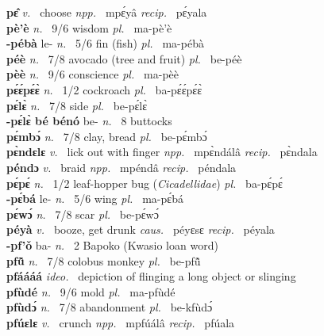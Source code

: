 {\bfseries pɛ̂}  {\itshape v.~} choose   {\itshape npp.~} mpɛ́yâ {\itshape recip.~} pɛ́yala  \\ 
{\bfseries pè'è}   {\itshape n.~} 9/6 wisdom {\itshape pl.~} ma-pè'è    \\ 
{\bfseries -pébà} le- {\itshape n.~} 5/6 fin (fish) {\itshape pl.~} ma-pébà    \\ 
{\bfseries péè} {\itshape n.~} 7/8 avocado (tree and fruit) {\itshape pl.~} be-péè    \\ 
{\bfseries pèè} {\itshape n.~} 9/6 conscience {\itshape pl.~} ma-pèè    \\ 
{\bfseries pɛ́ɛ́pɛ́ɛ̀}  {\itshape n.~} 1/2 cockroach {\itshape pl.~} ba-pɛ́ɛ́pɛ́ɛ̀    \\ 
{\bfseries pɛ́lɛ̀}  {\itshape n.~} 7/8 side {\itshape pl.~} be-pɛ́lɛ̀    \\ 
{\bfseries -pɛ́lɛ̀ bé bénó} be- {\itshape n.~} 8 buttocks    \\ 
{\bfseries pɛ́mbɔ́}  {\itshape n.~} 7/8 clay, bread {\itshape pl.~} be-pɛ́mbɔ́    \\ 
{\bfseries pɛ̀ndɛlɛ}  {\itshape v.~} lick out with finger   {\itshape npp.~} mpɛ̀ndálâ {\itshape recip.~} pɛ̀ndala  \\ 
{\bfseries péndɔ}  {\itshape v.~} braid   {\itshape npp.~} mpéndâ {\itshape recip.~} péndala  \\ 
{\bfseries pɛ́pɛ́}  {\itshape n.~} 1/2 leaf-hopper bug ({\itshape Cicadellidae}) {\itshape pl.~} ba-pɛ́pɛ́    \\ 
{\bfseries -pɛ́bá} le- {\itshape n.~} 5/6 wing {\itshape pl.~} ma-pɛ́bá    \\ 
{\bfseries pɛ́wɔ́}  {\itshape n.~} 7/8 scar {\itshape pl.~} be-pɛ́wɔ́    \\ 
{\bfseries péyà}  {\itshape v.~} booze, get drunk   {\itshape caus.~} péyɛsɛ {\itshape recip.~} péyala  \\ 
{\bfseries -pf'ǒ} ba- {\itshape n.~} 2 Bapoko (Kwasio loan word)    \\ 
{\bfseries pfũ̂}  {\itshape n.~} 7/8 colobus monkey {\itshape pl.~} be-pfũ̂    \\ 
{\bfseries pfáááá}  {\itshape ideo.~} depiction of flinging a long object or slinging    \\ 
{\bfseries pfùdé}  {\itshape n.~} 9/6 mold {\itshape pl.~} ma-pfùdé    \\ 
{\bfseries pfùdɔ́}  {\itshape n.~} 7/8 abandonment {\itshape pl.~} be-kfùdɔ́    \\ 
{\bfseries pfúɛlɛ}  {\itshape v.~} crunch   {\itshape npp.~} mpfúálâ {\itshape recip.~} pfúala  \\ 
